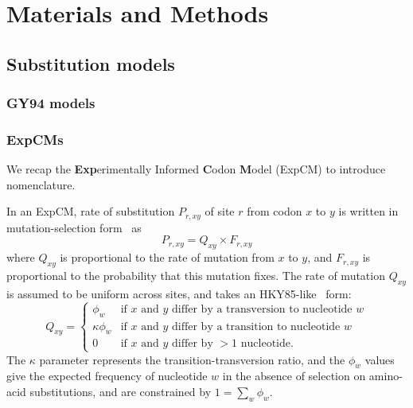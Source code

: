 \documentclass[11pt]{article}
\begin{document}
\newpage
\section*{Materials and Methods}

\subsection*{Substitution models}
\subsubsection*{GY94 models}
\subsubsection*{ExpCMs}
We recap the \textbf{Exp}erimentally Informed \textbf{C}odon \textbf{M}odel (ExpCM) \citep{bloom2014experimentally,bloom2014informed,bloom2017identification,hilton2017phydms} to introduce nomenclature. 

In an ExpCM, rate of substitution $P_{r,xy}$ of site $r$ from codon $x$ to $y$ is written in mutation-selection form~\citep{halpern1998evolutionary,mccandlish2014modeling,spielman2015relationship} as
\begin{equation}
P_{r,xy} = Q_{xy} \times F_{r,xy}
\end{equation}
where $Q_{xy}$ is proportional to the rate of mutation from $x$ to $y$, and $F_{r,xy}$ is proportional to the probability that this mutation fixes.
The rate of mutation $Q_{xy}$ is assumed to be uniform across sites, and takes an HKY85-like~\citep{hasegawa1985dating} form:
\begin{equation}
Q_{xy} = 
\begin{cases}
\phi_w & \mbox{if $x$ and $y$ differ by a transversion to nucleotide $w$} \\
\kappa \phi_w & \mbox{if $x$ and $y$ differ by a transition to nucleotide $w$} \\
0 & \mbox{if $x$ and $y$ differ by $>1$ nucleotide.}
\end{cases}
\end{equation}
The $\kappa$ parameter represents the transition-transversion ratio, and the $\phi_w$ values give the expected frequency of nucleotide $w$ in the absence of selection on amino-acid substitutions, and are constrained by $1 = \sum_w \phi_w$.
\end{document}
